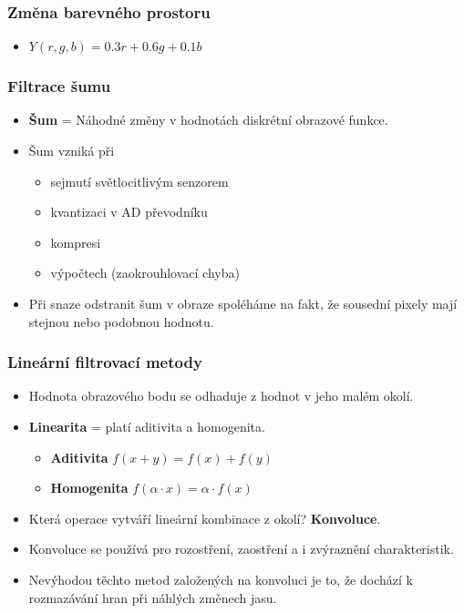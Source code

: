 \documentclass[FM]{tulpresentation}
\begin{document}
	\begin{frame}
		\frametitle{Změna barevného prostoru}
		\begin{itemize}
			\item $Y(r,g,b) = 0.3r + 0.6g + 0.1b$
		\end{itemize}
	\end{frame}
	
	\begin{frame}
		\frametitle{Filtrace šumu}
		\begin{itemize}
			\item \textbf{Šum} = Náhodné změny v hodnotách diskrétní obrazové funkce.
			\item Šum vzniká při
			\begin{itemize}
				\item sejmutí světlocitlivým senzorem
				\item kvantizaci v AD převodníku
				\item kompresi
				\item výpočtech (zaokrouhlovací chyba)
			\end{itemize}
			\item Při snaze odstranit šum v obraze spoléháme na fakt, že sousední pixely mají stejnou nebo podobnou hodnotu.
		\end{itemize}
	\end{frame}
	
	\begin{frame}
		\frametitle{Lineární filtrovací metody}
		\begin{itemize}
			\item Hodnota obrazového bodu se odhaduje z hodnot v jeho malém okolí.
			\item \textbf{Linearita} = platí aditivita a homogenita.
			\begin{itemize}
				\item \textbf{Aditivita} $f(x + y) = f(x) + f(y)$
				\item \textbf{Homogenita} $f(\alpha \cdot x) = \alpha \cdot f(x)$
			\end{itemize}
			\item Která operace vytváří lineární kombinace z okolí? \textbf{Konvoluce}.
			\item Konvoluce se používá pro rozostření, zaostření a i zvýraznění charakteristik.
			\item Nevýhodou těchto metod založených na 			konvoluci je to, že dochází k rozmazávání hran při náhlých změnech jasu.
		\end{itemize}
	\end{frame}
  
\end{document}
